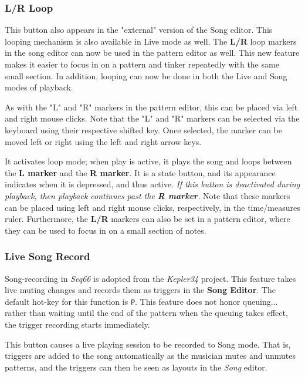 \subsubsection{L/R Loop}
\label{subsubsec:introduction_loop_button}

   This button also appears in the "external" version of the Song editor.
   This looping mechanism is also available in Live mode as well.
   The \textbf{L/R} loop markers in the song editor can now
   be used in the pattern editor as well.  This new feature makes it easier to
   focus in on a pattern and tinker repeatedly with the same small section.
   In addition, looping can now be done in both the Live and Song modes of
   playback.

   As with the "L" and "R" markers in the pattern editor, this can
   be placed via left and right mouse clicks.
   Note that the "L" and "R" markers can be selected via the keyboard using
   their respective shifted key.  Once selected, the marker can be moved left
   or right using the left and right arrow keys.

   It activates loop mode; when play is active, it plays the song and loops
   between the
   \textbf{L marker} and the \textbf{R marker}.
   It is a state button, and its appearance indicates when it is
   depressed, and thus active.
   \textsl{If this button is deactivated during playback, then playback
   continues past the \textbf{R marker}.}
   Note that these markers can be placed using left
   and right mouse clicks, respectively, in the time/measures ruler.
   Furthermore, the \textbf{L/R} markers can also be set in a pattern editor,
   where they can be used to focus in on a small section of notes.

\subsubsection{Live Song Record}
\label{subsubsec:introduction_live_record_button}

   Song-recording in \textsl{Seq66} is adopted from the
   \textsl{Kepler34} project.
   This feature takes live muting changes and records them as
   triggers in the \textbf{Song Editor}.
   The default hot-key for this function is \texttt{P}.
   This feature does not honor queuing...
   rather than waiting until the end of the pattern when the queuing takes
   effect, the trigger recording starts immediately.

   This button causes a live playing session to be recorded to Song mode.
   That is, triggers are added to the song automatically as the musician mutes
   and unmutes patterns, and the triggers can then be
   seen as layouts in the \textsl{Song} editor.

